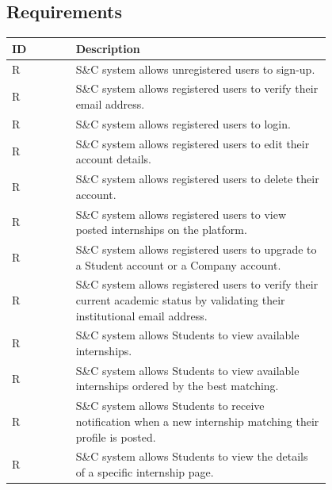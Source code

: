 \subsection{Requirements}
\label{subsec: requirements}%
\setcounter{h}{0}
\newcommand{\ch}{\stepcounter{h}R\theh}

\begin{center}
    \renewcommand{\arraystretch}{2}
    \begin{longtable}{ l p{0.8\linewidth} } 
        \hline

        \textbf{ID} & \textbf{Description}                                                \\
        \hline
        \ch      & S\&C system allows unregistered users to sign-up.\\
        \hline
        \ch      & S\&C system allows registered users to verify their email address.\\
        \hline
        \ch      & S\&C system allows registered users to login.   \\
        \hline
        \ch      & S\&C system allows registered users to edit their account details.   \\
        \hline
        \ch      & S\&C system allows registered users to delete their account.   \\
        \hline
        \ch      & S\&C system allows registered users to view posted internships on the platform.   \\
        \hline
        \ch      & S\&C system allows registered users to upgrade to a Student account or a Company account. \\                     
        \hline
        \ch      & S\&C system allows registered users to verify their current academic status by validating their institutional email address.\\                     
        \hline
        \ch      & S\&C system allows Students to view available internships. \\  
        \hline
        \ch      & S\&C system allows Students to view available internships ordered by the best matching. \\
        \hline
        \ch      & S\&C system allows Students to receive notification when a new internship matching their profile is posted.\\  
        \hline
        \ch      & S\&C system allows Students to view the details of a specific internship page. \\ 
        \hline

\end{longtable}
\end{center}
